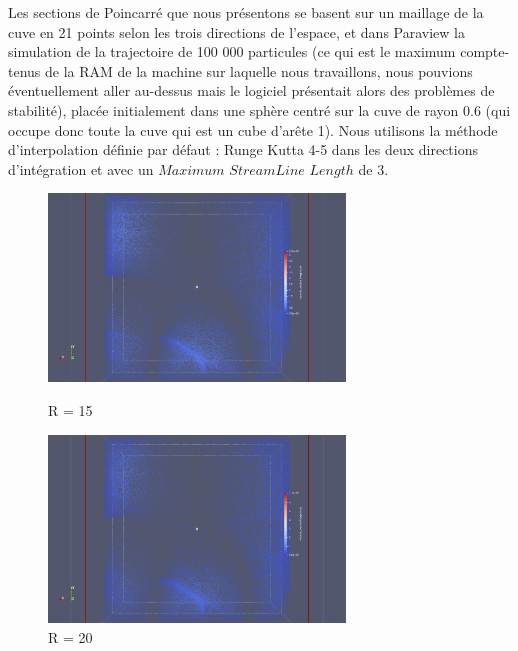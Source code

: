 \documentclass[a4paper,12pt,titlepage]{report}
\begin{document}
\begin{onehalfspace}
Les sections de Poincarré que nous présentons se basent sur un maillage de la cuve en 21 points selon les trois directions de l'espace, et dans Paraview la simulation de la trajectoire de 100 000 particules (ce qui est le maximum compte-tenus de la RAM de la machine sur laquelle nous travaillons, nous pouvions éventuellement aller au-dessus mais le logiciel présentait alors des problèmes de stabilité), placée initialement dans une sphère centré sur la cuve de rayon 0.6 (qui occupe donc toute la cuve qui est un cube d'arête 1). 
Nous utilisons la méthode d'interpolation définie par défaut : Runge Kutta 4-5 dans les deux directions d'intégration et avec un $Maximum$ $StreamLine$ $Length$ de 3. 

\begin{figure}[!h]
    \begin{minipage}[c]{.46\linewidth}
        \centering
        \includegraphics[height = 5cm, keepaspectratio]{graphes/Paraview/section_pioncarre_R_15.png}
        \caption{R = 15}
    \end{minipage}
    \hfill%
    \begin{minipage}[c]{.46\linewidth}
        \centering
        \includegraphics[height = 5cm, keepaspectratio]{graphes/Paraview/section_pioncarre_R_20.png}
        \caption{R = 20}
    \end{minipage}
\end{figure}
\begin{figure}[!h]
    \begin{minipage}[c]{.46\linewidth}
        \centering

\end{minipage}
\end{figure}
\end{onehalfspace}
\end{document}

